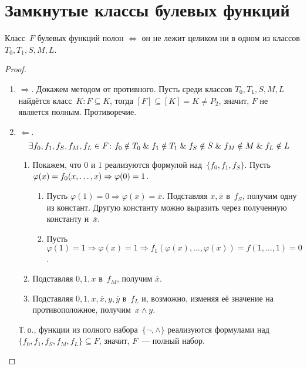 \section{Замкнутые классы булевых функций}
\begin{theorem}
Класс~$F$ булевых функций полон $\Leftrightarrow$ он не лежит целиком ни в одном из классов $T_0, T_1, S, M, L$.
\end{theorem}
\begin{proof}
\begin{enumerate}
	\item $\Rightarrow$. Докажем методом от противного.
	Пусть среди классов $T_0, T_1, S, M, L$ найдётся класс~$K \colon F \subseteq K$, тогда $[F] \subseteq [K] = K \neq P_2$, значит, $F$ не является полным.
	Противоречие.
	
	\item $\Leftarrow$.
	\begin{equation*}
	\exists f_0, f_1, f_S, f_M, f_L \in F \colon
	f_0 \notin T_0 \mathrel{\&} f_1 \notin T_1 \mathrel{\&} f_S \notin S \mathrel{\&} f_M \notin M \mathrel{\&} f_L \notin L
	\end{equation*}
	\begin{enumerate}
		\item Покажем, что $0$ и $1$ реализуются формулой над~$\{ f_0, f_1, f_S \}$.
		Пусть $\varphi(x) = f_0(x, \ldots, x) \opbr\Rightarrow \varphi(0) = 1$.
		\begin{enumerate}
			\item Пусть $\varphi(1) = 0 \Rightarrow \varphi(x) = \overline x$.
			Подставляя $x, \overline x$ в~$f_S$, получим одну из констант.
			Другую константу можно выразить через полученную константу и~$\overline x$.
			\item Пусть $\varphi(1) = 1 \Rightarrow \varphi(x) = 1 \Rightarrow
			f_1(\varphi(x), \ldots, \varphi(x)) = f(1, \ldots, 1) = 0$.
		\end{enumerate}
		
		\item Подставляя $0, 1, x$ в~$f_M$, получим $\overline x$.
		
		\item Подставляя $0, 1, x, \overline x, y, \overline y$ в~$f_L$ и, возможно, изменяя её значение на противоположное, получим~$x \land y$.
	\end{enumerate}
	
	Т.\,о., функции из полного набора~$\{ \neg, \land \}$ реализуются формулами над~$\{ f_0, f_1, f_S, f_M, f_L \} \subseteq F$, значит, $F$~--- полный набор.
\end{enumerate}
\end{proof}

